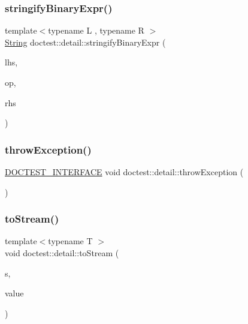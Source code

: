 \subsubsection{\texorpdfstring{stringify\+Binary\+Expr()}{stringifyBinaryExpr()}}
{\footnotesize\ttfamily template$<$typename L , typename R $>$ \\
\hyperlink{classdoctest_1_1String}{String} doctest\+::detail\+::stringify\+Binary\+Expr (\begin{DoxyParamCaption}\item[{const \hyperlink{doctest_8h_af2901cafb023c57fb672ccb1bf14f2eb}{D\+O\+C\+T\+E\+S\+T\+\_\+\+R\+E\+F\+\_\+\+W\+R\+AP}(L)}]{lhs,  }\item[{const char $\ast$}]{op,  }\item[{const \hyperlink{doctest_8h_af2901cafb023c57fb672ccb1bf14f2eb}{D\+O\+C\+T\+E\+S\+T\+\_\+\+R\+E\+F\+\_\+\+W\+R\+AP}(R)}]{rhs }\end{DoxyParamCaption})}

\mbox{\label{namespacedoctest_1_1detail_a60ffd50b9ee7adfcafc078f333aac8b6}} 
\subsubsection{\texorpdfstring{throw\+Exception()}{throwException()}}
{\footnotesize\ttfamily \hyperlink{doctest_8h_a9c16ffc635ec47f07797d21ede26b1a5}{D\+O\+C\+T\+E\+S\+T\+\_\+\+I\+N\+T\+E\+R\+F\+A\+CE} void doctest\+::detail\+::throw\+Exception (\begin{DoxyParamCaption}{ }\end{DoxyParamCaption})}

\mbox{\label{namespacedoctest_1_1detail_a71b40611173c82709726b36715229179}} 
\subsubsection{\texorpdfstring{to\+Stream()}{toStream()}\hspace{0.1cm}{\footnotesize\ttfamily [1/16]}}
{\footnotesize\ttfamily template$<$typename T $>$ \\
void doctest\+::detail\+::to\+Stream (\begin{DoxyParamCaption}\item[{\hyperlink{doctest_8h_a116af65cb5e924b33ad9d9ecd7a783f3}{std\+::ostream} $\ast$}]{s,  }\item[{const T \&}]{value }\end{DoxyParamCaption})}

